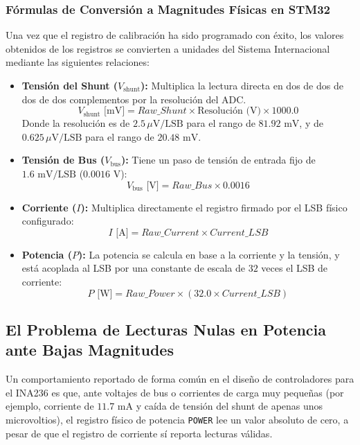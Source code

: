\documentclass[
10pt, %
a4paper, %
oneside, %
headinclude,footinclude, %
BCOR5mm, %
]{scrartcl}
\begin{document}
\subsubsection{Fórmulas de Conversión a Magnitudes Físicas en STM32}
Una vez que el registro de calibración ha sido programado con éxito, los valores obtenidos de los registros se convierten a unidades del Sistema Internacional mediante las siguientes relaciones:
\begin{itemize}
	\item \textbf{Tensión del Shunt ($V_{\text{shunt}}$):} Multiplica la lectura directa en dos de dos de dos de dos complementos por la resolución del ADC.
	\begin{equation}
		V_{\text{shunt}}\text{ [mV]} = Raw\_Shunt \times \text{Resolución (V)} \times 1000.0
	\end{equation}
	Donde la resolución es de $2.5\,\mu\text{V/LSB}$ para el rango de $81.92\text{ mV}$, y de $0.625\,\mu\text{V/LSB}$ para el rango de $20.48\text{ mV}$.
	\item \textbf{Tensión de Bus ($V_{\text{bus}}$):} Tiene un paso de tensión de entrada fijo de $1.6\text{ mV/LSB}$ ($0.0016\text{ V}$):
	\begin{equation}
		V_{\text{bus}}\text{ [V]} = Raw\_Bus \times 0.0016
	\end{equation}
	\item \textbf{Corriente ($I$):} Multiplica directamente el registro firmado por el LSB físico configurado:
	\begin{equation}
		I\text{ [A]} = Raw\_Current \times Current\_LSB
	\end{equation}
	\item \textbf{Potencia ($P$):} La potencia se calcula en base a la corriente y la tensión, y está acoplada al LSB por una constante de escala de $32$ veces el LSB de corriente:
	\begin{equation}
		P\text{ [W]} = Raw\_Power \times \left(32.0 \times Current\_LSB\right)
	\end{equation}
\end{itemize}

\subsection{El Problema de Lecturas Nulas en Potencia ante Bajas Magnitudes}
Un comportamiento reportado de forma común en el diseño de controladores para el INA236 es que, ante voltajes de bus o corrientes de carga muy pequeñas (por ejemplo, corriente de $11.7\text{ mA}$ y caída de tensión del shunt de apenas unos microvoltios), el registro físico de potencia \texttt{POWER} lee un valor absoluto de cero, a pesar de que el registro de corriente sí reporta lecturas válidas. 
\end{document}
